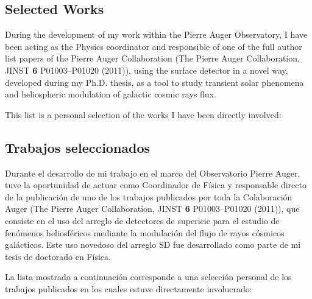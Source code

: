 \ifeng
\subsection*{Selected Works}
\noindent
During the development of my work within the Pierre Auger Observatory, I have
been acting as the Physics coordinator and responsible of one of the full
author list papers of the Pierre Auger Collaboration (The Pierre Auger
Collaboration, JINST {\bf 6} P01003--P01020 (2011)), using the surface detector
in a novel way, developed during my Ph.D. thesis, as a tool to study transient
solar phenomena and heliospheric modulation of galactic cosmic rays flux.

This list is a personal selection of the works I have been directly involved:

\else
\subsection*{Trabajos seleccionados}
\noindent
Durante el desarrollo de mi trabajo en el marco del Observatorio Pierre Auger, tuve la oportunidad de actuar como Coordinador de Física y responsable directo de la publicación de uno de los trabajos publicados por toda la Colaboración Auger (The Pierre Auger Collaboration, JINST {\bf 6} P01003--P01020 (2011)), que consiste en el uso del arreglo de detectores de supericie para el estudio de fenómenos heliosféricos mediante la modulación del flujo de rayos cósmicos galácticos. Este uso novedoso del arreglo SD fue desarrollado como parte de mi tesis de doctorado en Física.

La lista mostrada a continuación corresponde a una selección personal de los trabajos publicados en los cuales estuve directamente involucrado:

\fi

